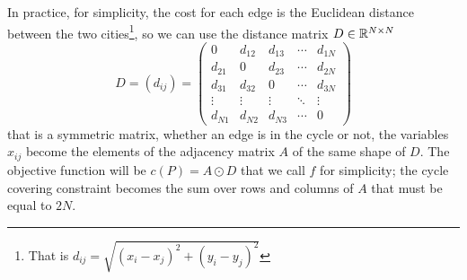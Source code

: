 In practice, for simplicity, the cost for each edge is the Euclidean distance between the two cities\footnote{That is $d_{ij}=\sqrt{(x_i-x_j)^2+(y_i-y_j)^2}$}, so we can use the distance matrix $D\in\mathbb{R}^{N\times N}$
\[
D=(d_{ij})=
\begin{pmatrix} 
	0 & d_{12} & d_{13} & \cdots & d_{1N} \\
	d_{21} & 0 & d_{23} & \cdots & d_{2N} \\
	d_{31} & d_{32} & 0 & \cdots & d_{3N} \\
	\vdots & \vdots & \vdots & \ddots & \vdots \\
	d_{N1} & d_{N2} & d_{N3} & \cdots & 0
\end{pmatrix}
\]
that is a symmetric matrix, whether an edge is in the cycle or not, the variables $x_{ij}$ become the elements of the adjacency matrix $A$ of the same shape of $D$. The objective function will be $c(P)=A\odot D$ that we call $f$ for simplicity; the cycle covering constraint becomes the sum over rows and columns of $A$ that must be equal to $2N$.






%
%


